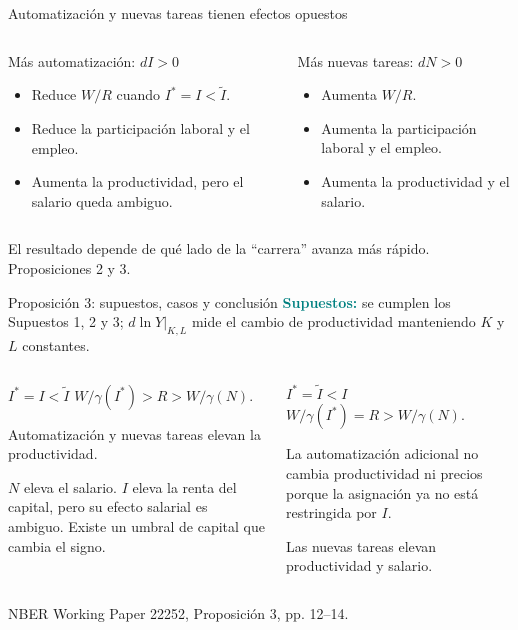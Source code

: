 \documentclass[aspectratio=169,11pt]{beamer}
\newcommand{\key}[1]{\textcolor{teal}{\textbf{#1}}}
\newcommand{\source}[1]{\vfill\hfill{\tiny\color{gray}#1}}
\begin{document}
\begin{frame}{Automatización y nuevas tareas tienen efectos opuestos}
  \begin{columns}[T,onlytextwidth]
      \begin{block}{Más automatización: $dI>0$}
        \begin{itemize}
          \item Reduce $W/R$ cuando $I^{*}=I<\widetilde I$.
          \item Reduce la participación laboral y el empleo.
          \item Aumenta la productividad, pero el salario queda ambiguo.
        \end{itemize}
      \end{block}
      \begin{block}{Más nuevas tareas: $dN>0$}
        \begin{itemize}
          \item Aumenta $W/R$.
          \item Aumenta la participación laboral y el empleo.
          \item Aumenta la productividad y el salario.
        \end{itemize}
      \end{block}
  \end{columns}
  \vspace{0.35cm}
  \centering
  \large El resultado depende de qué lado de la ``carrera'' avanza más rápido.
  \source{Proposiciones 2 y 3.}
\end{frame}

\begin{frame}{Proposición 3: supuestos, casos y conclusión}
  \small
  \key{Supuestos:} se cumplen los Supuestos 1, 2 y 3; $d\ln Y\vert_{K,L}$ mide el cambio de productividad manteniendo $K$ y $L$ constantes.
  \vspace{0.3cm}
  \begin{columns}[T,onlytextwidth]
      \begin{block}{$I^{*}=I<\widetilde I$}
        $W/\gamma(I^{*})>R>W/\gamma(N)$.

        Automatización y nuevas tareas elevan la productividad.

        $N$ eleva el salario. $I$ eleva la renta del capital, pero su efecto salarial es ambiguo. Existe un umbral de capital que cambia el signo.
      \end{block}
      \begin{block}{$I^{*}=\widetilde I<I$}
        $W/\gamma(I^{*})=R>W/\gamma(N)$.

        La automatización adicional no cambia productividad ni precios porque la asignación ya no está restringida por $I$.

        Las nuevas tareas elevan productividad y salario.
      \end{block}
  \end{columns}
  \source{NBER Working Paper 22252, Proposición 3, pp. 12--14.}
\end{frame}
\end{document}
